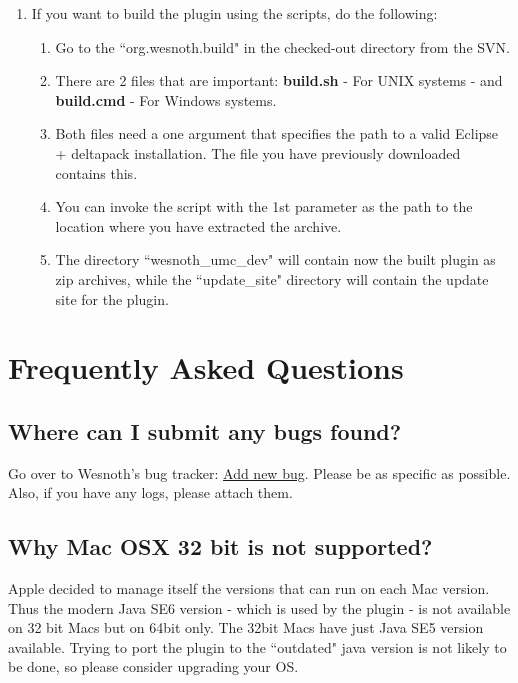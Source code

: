 \documentclass[10pt]{article}
\begin{document}
\begin{enumerate}
  \item If you want to build the plugin using the scripts, do the following:
  \begin{enumerate}
    \item Go to the ``org.wesnoth.build" in the checked-out directory from the SVN.
    \item There are 2 files that are important: \textbf{build.sh} - For UNIX systems - and \textbf{build.cmd} - For Windows systems.
    \item Both files need a one argument that specifies the path to a valid Eclipse + deltapack installation. The file you have previously downloaded contains this. 
    \item You can invoke the script with the 1st parameter as the path to the location where you have extracted the archive.
    \item The directory ``wesnoth\_umc\_dev" will contain now the built plugin as zip archives, while the ``update\_site" directory will contain the update site for the plugin.
  \end{enumerate}
\end{enumerate}

\section{Frequently Asked Questions}
\subsection{Where can I submit any bugs found?}
Go over to Wesnoth's bug tracker: \href{https://gna.org/bugs/?func=additem&group=wesnoth&bug_group_id=116}{Add new bug}. Please be as specific as possible. Also, if you have any logs, please attach them.

\subsection{Why Mac OSX 32 bit is not supported?}
Apple decided to manage itself the versions that can run on each Mac version. Thus the modern Java SE6 version - which is used by the plugin - is not available on 32 bit Macs but on 64bit only. The 32bit Macs have just Java SE5 version available. Trying to port the plugin to the ``outdated" java version is not likely to be done, so please consider upgrading your OS.
\end{document}
